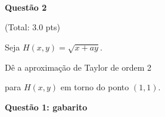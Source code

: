 \documentclass[oneside,12pt]{article}
\begin{document}

\unitlength=15pt

\def\grd{\scalebox{0.6}{$\ga{barranco VSB}$}}

$\begin{array}{ccccc}
 \grd && \grd && \grd \\ \\
 \grd && \grd && \grd \\
 \end{array}
$

\newpage


{\bf Questão 2}

\T(Total: 3.0 pts)

\msk

Seja $H(x,y) = \sqrt{x+ay}$.

Dê a aproximação de Taylor de ordem 2

para $H(x,y)$ em torno do ponto $(1,1)$.


%



\newpage


\pu

{\bf Questão 1: gabarito}
\end{document}
